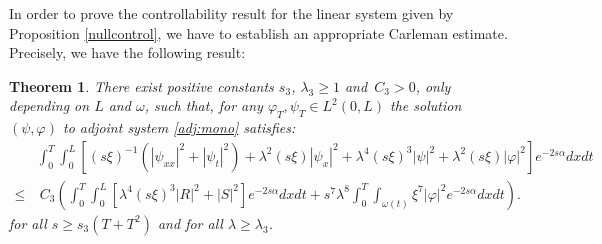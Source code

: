 \documentclass[10pt]{article}
\newtheorem{thm}{Theorem}
\def\om{\omega}
\def\\Phivec{\mathbf{\Phi}}
\newcommand{\iiTL}{\int_0^T\!\!\!\!\int_0^L }
\begin{document}
	In order to prove the controllability result for the linear system given by Proposition \ref{nullcontrol}, we have to establish an appropriate Carleman estimate.
	Precisely, we have the following result:
\begin{thm}\label{thm:Carl_mono}
	There exist positive constants $s_3$, $\lambda_3\geq 1$ and~$C_3>0$, only depending on $L$ and $\omega$, such that,
	for any $\varphi_T,\psi _T\in L^2(0,L)$ the solution $(\psi,\varphi)$ to adjoint system \eqref{adj:mono} satisfies:
\begin{align}
		&\iiTL[(s\xi)^{-1}(|\psi_{xx}|^2+|\psi_t|^2)+\lambda^2(s\xi)|\psi_x|^2+\lambda ^4(s\xi)^3|\psi|^2+\lambda ^2 (s\xi)   |\varphi |^2 ]e^{-2s\alpha}dxdt\nonumber\\
		\le &~C_3
		\left(\iiTL\![\lambda ^4(s\xi)^3|R|^2+|S|^2] e^{-2s\alpha} dxdt +
		 { s^7\lambda^8}\int_0^T \!\!\!\int_{\om(t)} \xi ^7  |\varphi|^2e^{-2s\alpha}  dxdt\right).\nonumber
	\end{align}
	for all  $s \geq  s_3(T + T^2) $ and for all $\lambda \geq \lambda_3$.
\end{thm}
\end{document}
